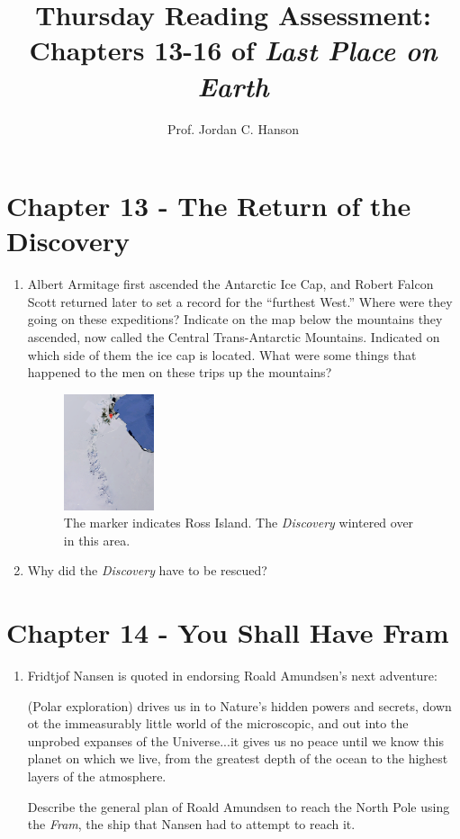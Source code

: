 \documentclass{article}
\begin{document}
\title{Thursday Reading Assessment: Chapters 13-16 of \textit{Last Place on Earth}}
\author{Prof. Jordan C. Hanson}

\maketitle

\section{Chapter 13 - The Return of the Discovery}

\begin{enumerate}
\item Albert Armitage first ascended the Antarctic Ice Cap, and Robert Falcon Scott returned later to set a record for the ``furthest West.''  Where were they going on these expeditions?  Indicate on the map below the mountains they ascended, now called the Central Trans-Antarctic Mountains.  Indicated on which side of them the ice cap is located.  What were some things that happened to the men on these trips up the mountains?
\begin{figure}[ht]
\centering
\includegraphics[width=0.25\textwidth]{ice.png}
\caption{\label{fig:ice} The marker indicates Ross Island.  The \textit{Discovery} wintered over in this area.}
\end{figure}
\item Why did the \textit{Discovery} have to be rescued? \\ \vspace{2cm}
\end{enumerate}

\section{Chapter 14 - You Shall Have Fram}

\begin{enumerate}
\item Fridtjof Nansen is quoted in endorsing Roald Amundsen's next adventure:
\begin{displayquote}
(Polar exploration) drives us in to Nature's hidden powers and secrets, down ot the immeasurably little world of the microscopic, and out into the unprobed expanses of the Universe...it gives us no peace until we know this planet on which we live, from the greatest depth of the ocean to the highest layers of the atmosphere.
\end{displayquote}
Describe the general plan of Roald Amundsen to reach the North Pole using the \textit{Fram}, the ship that Nansen had to attempt to reach it. \\ \vspace{3cm}
\end{enumerate}
\end{document}
